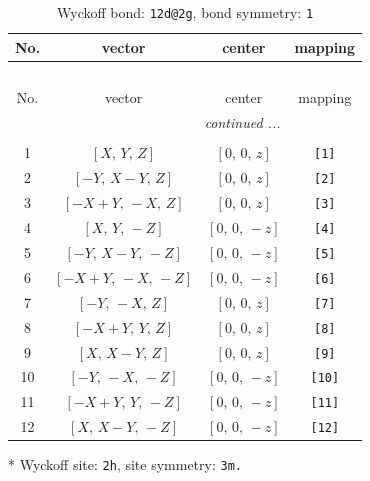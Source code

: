 \documentclass[fleqn,8pt]{jsarticle}
\begin{document}
\begin{longtable}{cccc}
\caption{Wyckoff bond: {\tt 12d@2g}, bond symmetry: {\tt 1}}
 \\
 \hline \hline
No. & vector & center & mapping \\ \hline \endfirsthead

\multicolumn{3}{l}{\tablename\ \thetable{}} \\
 \hline \hline
No. & vector & center & mapping \\ \hline \endhead

 \hline \hline
\multicolumn{3}{r}{\footnotesize\it continued ...} \\ \endfoot

 \hline \hline
\multicolumn{3}{r}{} \\ \endlastfoot

1 & $\left[ X,\, Y,\, Z \right]$ & $\left[ 0,\, 0,\, z \right]$ & {\tt [1]} \\ \hline
2 & $\left[ - Y,\, X - Y,\, Z \right]$ & $\left[ 0,\, 0,\, z \right]$ & {\tt [2]} \\ \hline
3 & $\left[ - X + Y,\, - X,\, Z \right]$ & $\left[ 0,\, 0,\, z \right]$ & {\tt [3]} \\ \hline
4 & $\left[ X,\, Y,\, - Z \right]$ & $\left[ 0,\, 0,\, - z \right]$ & {\tt [4]} \\ \hline
5 & $\left[ - Y,\, X - Y,\, - Z \right]$ & $\left[ 0,\, 0,\, - z \right]$ & {\tt [5]} \\ \hline
6 & $\left[ - X + Y,\, - X,\, - Z \right]$ & $\left[ 0,\, 0,\, - z \right]$ & {\tt [6]} \\ \hline
7 & $\left[ - Y,\, - X,\, Z \right]$ & $\left[ 0,\, 0,\, z \right]$ & {\tt [7]} \\ \hline
8 & $\left[ - X + Y,\, Y,\, Z \right]$ & $\left[ 0,\, 0,\, z \right]$ & {\tt [8]} \\ \hline
9 & $\left[ X,\, X - Y,\, Z \right]$ & $\left[ 0,\, 0,\, z \right]$ & {\tt [9]} \\ \hline
10 & $\left[ - Y,\, - X,\, - Z \right]$ & $\left[ 0,\, 0,\, - z \right]$ & {\tt [10]} \\ \hline
11 & $\left[ - X + Y,\, Y,\, - Z \right]$ & $\left[ 0,\, 0,\, - z \right]$ & {\tt [11]} \\ \hline
12 & $\left[ X,\, X - Y,\, - Z \right]$ & $\left[ 0,\, 0,\, - z \right]$ & {\tt [12]} \\
\end{longtable}
* Wyckoff site: {\tt 2h}, site symmetry: {\tt 3m.}
\renewcommand{\arraystretch}{1.2}
\end{document}
